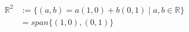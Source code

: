 \documentclass[preview]{standalone}
\begin{document}
\begin{align*}
\mathbb{R}^2& := \{ (a,b)= a(1,0)+b(0,1) \mid a , b \in \mathbb{R} \} \\ & = span \{ (1,0) , (0,1) \}
\end{align*}
\end{document}
